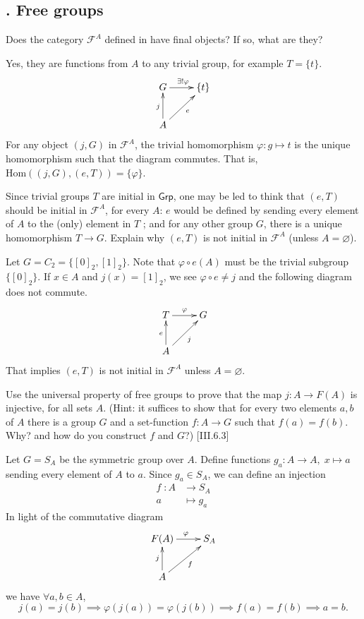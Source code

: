 \documentclass[12pt,letterpaper,boxed]{hmcpset}
\newcommand{\Hom}{\mathrm{Hom}}
\newcommand{\Grp}{\mathsf{Grp}}
\begin{document}
\subsection{. Free groups} 
\begin{problem}[5.1]
	Does the category $\mathscr{F}^A$ defined in  have final objects? If so, what are they?
\end{problem}
\begin{solution}
	Yes, they are functions from $A$ to any trivial group, for example $T=\{t\}$.
	\[\xymatrix{
		G \ar[r]^{\exists!\varphi} & \{t\}\\
		A\ar[ru]_{e}\ar[u]^{j}  
	}\]
	For any object $(j,G)$ in $\mathscr{F}^A$, the trivial homomorphism $\varphi:g\mapsto t$ is the unique homomorphism such that the diagram commutes. That is, $\Hom((j,G),(e,T))=\{\varphi\}$.
\end{solution}


\begin{problem}[5.2]
	Since trivial groups $T$ are initial in $\Grp$, one may be led to think that $(e,T)$ should be initial in $\mathscr{F}^A$, for every $A$: $e$ would be defined by sending every element of $A$ to the (only) element in $T$ ; and for any other group $G$, there is a unique homomorphism $T\rightarrow G$. Explain why $(e, T)$ is not initial in $\mathscr{F}^A$ (unless $A =\varnothing$).
\end{problem}
\begin{solution}
	Let $G=C_2=\{[0]_2,[1]_2\}$. Note that $\varphi\circ e(A)$ must be the trivial subgroup $\{[0]_2\}$. If $x\in A$ and $j(x)=[1]_2$, we see $\varphi\circ e\ne j$ and the following diagram does not commute. 
	\[\xymatrix{
		T\ar[r]^{\varphi} & G\\
		A\ar[ru]_{j}\ar[u]^{e}  
	}\]
	That implies $(e, T)$ is not initial in $\mathscr{F}^A$ unless $A =\varnothing$.
\end{solution}



\begin{problem}[5.3]
	Use the universal property of free groups to prove that the map $j:A\rightarrow F(A)$ is injective, for all sets $A$. (Hint: it suffices to show that for every two elements $a, b$	of $A$ there is a group $G$ and a set-function $f : A\rightarrow G$ such that $f(a)=f(b)$. Why? and how do you construct $f$ and $G$?) [\textsection III.6.3]
\end{problem}
\begin{solution}
	Let $G=S_A$ be the symmetric group over $A$. Define functions $g_a:A\rightarrow A,\;x\mapsto a$ sending every element of $A$ to $a$.
	Since $g_a\in S_A$, we can define an injection
	\[
	\begin{aligned}
	f\;: A&\longrightarrow S_A\\  
	a&\longmapsto g_a
	\end{aligned}
	\]
	In light of the commutative diagram
	\[\xymatrix{
		F(A) \ar[r]^{\varphi} &S_A\\
		A\ar[ru]_{f}\ar[u]^{j}  
	}\]	
	we have $\forall a,b\in A$,
	\[
	j(a)=j(b)\implies\varphi(j(a))=\varphi(j(b))\implies f(a)=f(b)\implies a=b.
	\]
\end{solution}
\end{document}
